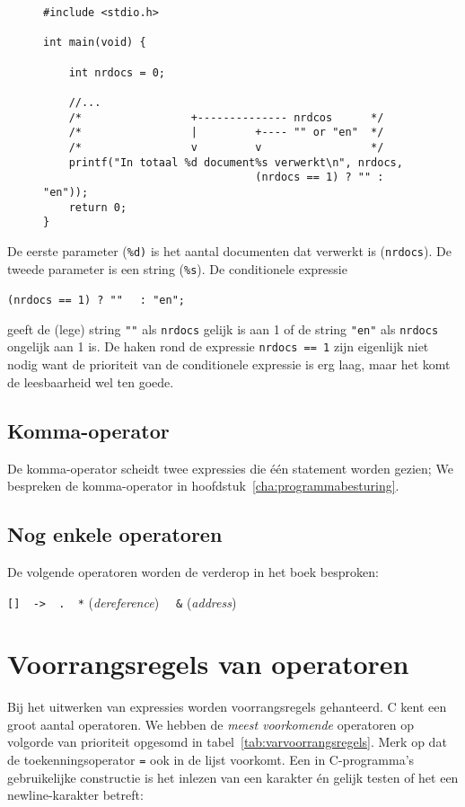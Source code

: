 \begin{figure}[!ht]
\begin{lstlisting}[caption=Het afdrukken van een meervoudsvorm.,label=cod:varnrdocs]
#include <stdio.h>

int main(void) {

    int nrdocs = 0;

    //...
    /*                 +-------------- nrdcos      */
    /*                 |         +---- "" or "en"  */
    /*                 v         v                 */
    printf("In totaal %d document%s verwerkt\n", nrdocs,
                                 (nrdocs == 1) ? "" : "en"));
    return 0;
}
\end{lstlisting}
\end{figure} 

De eerste parameter (\texttt{\%d)} is het aantal documenten dat verwerkt is (\texttt{nrdocs}). De tweede parameter is een string (\texttt{\%s}). De conditionele expressie

\hspace*{1em}\lstinline[basicstyle=\ttfamily]|(nrdocs == 1) ? "" | \lstinline[basicstyle=\ttfamily]| : "en";|

geeft de (lege) string \lstinline[basicstyle=\ttfamily]|""| als \texttt{nrdocs} gelijk is aan 1 of de string \lstinline[basicstyle=\ttfamily]|"en"| als \texttt{nrdocs} ongelijk aan 1 is. De haken rond de expressie \texttt{nrdocs == 1} zijn eigenlijk niet nodig want de prioriteit van de conditionele expressie is erg laag, maar het komt de leesbaarheid wel ten goede.

\subsection{Komma-operator}
De komma-operator scheidt twee expressies die één statement worden gezien; We bespreken de komma-operator in hoofdstuk~\ref{cha:programmabesturing}.

\subsection{Nog enkele operatoren}
De volgende operatoren worden de verderop in het boek besproken:

\hspace*{1cm}\texttt{[]\ \ ->\ \ .\ \ *} (\textsl{dereference}) \texttt{\ \ \&} (\textsl{address})

\section{Voorrangsregels van operatoren}
Bij het uitwerken van expressies worden voorrangsregels gehanteerd. C kent een groot aantal operatoren. We hebben de \textsl{meest voorkomende} operatoren op volgorde van prioriteit opgesomd in tabel~\ref{tab:varvoorrangsregels}. Merk op dat de toekenningsoperator \texttt{=} ook in de lijst voorkomt. Een in C-programma's gebruikelijke constructie is het inlezen van een karakter én gelijk testen of het een newline-karakter betreft:

